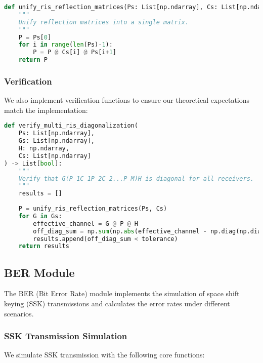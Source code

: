 \begin{lstlisting}[language=python, caption={Unifying RIS matrices}]
def unify_ris_reflection_matrices(Ps: List[np.ndarray], Cs: List[np.ndarray]) -> np.ndarray:
    """
    Unify reflection matrices into a single matrix.
    """
    P = Ps[0]
    for i in range(len(Ps)-1):
        P = P @ Cs[i] @ Ps[i+1]
    return P
\end{lstlisting}

\subsubsection{Verification}

We also implement verification functions to ensure our theoretical expectations match the implementation:

\begin{lstlisting}[language=python, caption={Verification of diagonalization}]
def verify_multi_ris_diagonalization(
    Ps: List[np.ndarray],
    Gs: List[np.ndarray],
    H: np.ndarray,
    Cs: List[np.ndarray]
) -> List[bool]:
    """
    Verify that G(P_1C_1P_2C_2...P_M)H is diagonal for all receivers.
    """
    results = []
    
    P = unify_ris_reflection_matrices(Ps, Cs)
    for G in Gs:
        effective_channel = G @ P @ H
        off_diag_sum = np.sum(np.abs(effective_channel - np.diag(np.diag(effective_channel))))
        results.append(off_diag_sum < tolerance)
    return results
\end{lstlisting}

\subsection{BER Module}

The BER (Bit Error Rate) module implements the simulation of space shift keying (SSK) transmissions and calculates the error rates under different scenarios.

\subsubsection{SSK Transmission Simulation}

We simulate SSK transmission with the following core functions:

